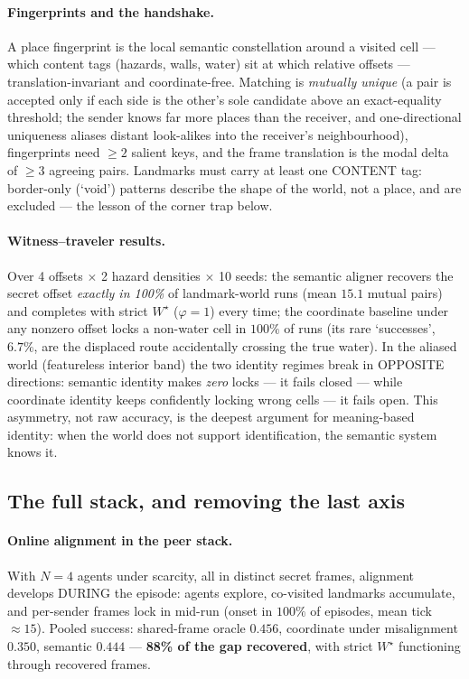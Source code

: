 \documentclass{article}
\newcommand{\wstar}{W^{\star}}
\begin{document}
\paragraph{Fingerprints and the handshake.} A place fingerprint is the
local semantic constellation around a visited cell --- which content
tags (hazards, walls, water) sit at which relative offsets ---
translation-invariant and coordinate-free. Matching is
\emph{mutually unique} (a pair is accepted only if each side is the
other's sole candidate above an exact-equality threshold; the sender
knows far more places than the receiver, and one-directional
uniqueness aliases distant look-alikes into the receiver's
neighbourhood), fingerprints need $\ge 2$ salient keys, and the frame
translation is the modal delta of $\ge 3$ agreeing pairs. Landmarks
must carry at least one CONTENT tag: border-only (`void') patterns
describe the shape of the world, not a place, and are excluded ---
the lesson of the corner trap below.

\paragraph{Witness--traveler results.} Over 4 offsets $\times$ 2
hazard densities $\times$ 10 seeds: the semantic aligner recovers the
secret offset \emph{exactly in 100\%} of landmark-world runs
(mean $15.1$ mutual pairs) and completes with strict $\wstar$
($\varphi{=}1$) every time; the coordinate baseline under any nonzero
offset locks a non-water cell in $100\%$ of runs (its rare
`successes', $6.7\%$, are the displaced route accidentally crossing
the true water). In the aliased world (featureless interior band) the
two identity regimes break in OPPOSITE directions: semantic identity
makes \emph{zero} locks --- it fails closed --- while coordinate
identity keeps confidently locking wrong cells --- it fails open.
This asymmetry, not raw accuracy, is the deepest argument for
meaning-based identity: when the world does not support
identification, the semantic system knows it.

\subsection{The full stack, and removing the last axis}
\label{sec:stack}

\paragraph{Online alignment in the peer stack.} With $N{=}4$ agents
under scarcity, all in distinct secret frames, alignment develops
DURING the episode: agents explore, co-visited landmarks accumulate,
and per-sender frames lock in mid-run (onset in $100\%$ of episodes,
mean tick ${\approx}15$). Pooled success: shared-frame oracle
$0.456$, coordinate under misalignment $0.350$, semantic $0.444$ ---
\textbf{88\% of the gap recovered}, with strict $\wstar$ functioning
through recovered frames.
\end{document}
